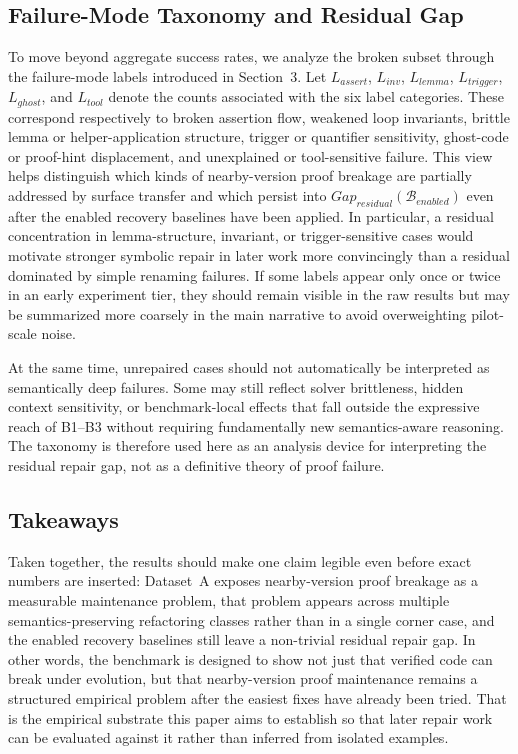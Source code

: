\subsection{Failure-Mode Taxonomy and Residual Gap}

To move beyond aggregate success rates, we analyze the broken subset through the failure-mode labels introduced in Section~3. Let $L_{\mathit{assert}}$, $L_{\mathit{inv}}$, $L_{\mathit{lemma}}$, $L_{\mathit{trigger}}$, $L_{\mathit{ghost}}$, and $L_{\mathit{tool}}$ denote the counts associated with the six label categories. These correspond respectively to broken assertion flow, weakened loop invariants, brittle lemma or helper-application structure, trigger or quantifier sensitivity, ghost-code or proof-hint displacement, and unexplained or tool-sensitive failure. This view helps distinguish which kinds of nearby-version proof breakage are partially addressed by surface transfer and which persist into $Gap_{\mathit{residual}}(\mathcal{B}_{\mathit{enabled}})$ even after the enabled recovery baselines have been applied. In particular, a residual concentration in lemma-structure, invariant, or trigger-sensitive cases would motivate stronger symbolic repair in later work more convincingly than a residual dominated by simple renaming failures. If some labels appear only once or twice in an early experiment tier, they should remain visible in the raw results but may be summarized more coarsely in the main narrative to avoid overweighting pilot-scale noise.



At the same time, unrepaired cases should not automatically be interpreted as semantically deep failures. Some may still reflect solver brittleness, hidden context sensitivity, or benchmark-local effects that fall outside the expressive reach of B1--B3 without requiring fundamentally new semantics-aware reasoning. The taxonomy is therefore used here as an analysis device for interpreting the residual repair gap, not as a definitive theory of proof failure.

\subsection{Takeaways}

Taken together, the results should make one claim legible even before exact numbers are inserted: Dataset~A exposes nearby-version proof breakage as a measurable maintenance problem, that problem appears across multiple semantics-preserving refactoring classes rather than in a single corner case, and the enabled recovery baselines still leave a non-trivial residual repair gap. In other words, the benchmark is designed to show not just that verified code can break under evolution, but that nearby-version proof maintenance remains a structured empirical problem after the easiest fixes have already been tried. That is the empirical substrate this paper aims to establish so that later repair work can be evaluated against it rather than inferred from isolated examples.
